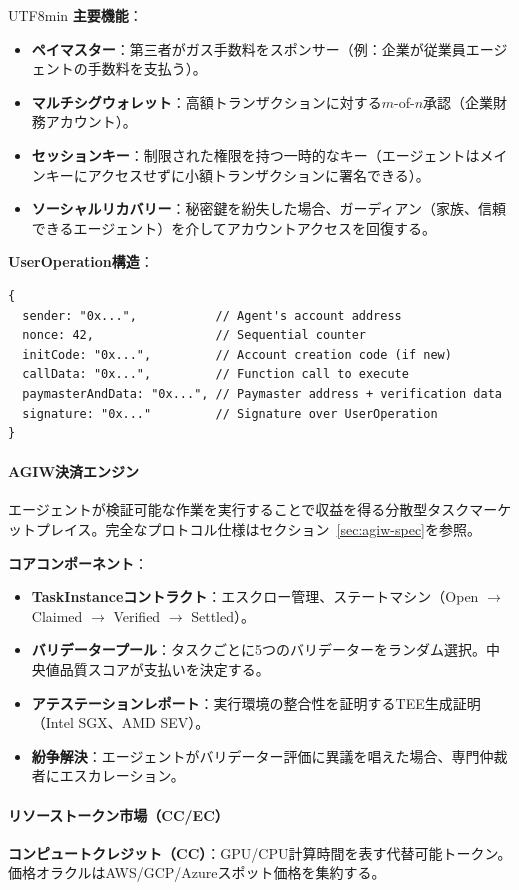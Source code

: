 \documentclass[11pt]{article}
\begin{document}
\begin{CJK}{UTF8}{min}
\textbf{主要機能}：
\begin{itemize}[noitemsep]
  \item \textbf{ペイマスター}：第三者がガス手数料をスポンサー（例：企業が従業員エージェントの手数料を支払う）。
  \item \textbf{マルチシグウォレット}：高額トランザクションに対する$m$-of-$n$承認（企業財務アカウント）。
  \item \textbf{セッションキー}：制限された権限を持つ一時的なキー（エージェントはメインキーにアクセスせずに小額トランザクションに署名できる）。
  \item \textbf{ソーシャルリカバリー}：秘密鍵を紛失した場合、ガーディアン（家族、信頼できるエージェント）を介してアカウントアクセスを回復する。
\end{itemize}

\textbf{UserOperation構造}：
\begin{verbatim}
{
  sender: "0x...",           // Agent's account address
  nonce: 42,                 // Sequential counter
  initCode: "0x...",         // Account creation code (if new)
  callData: "0x...",         // Function call to execute
  paymasterAndData: "0x...", // Paymaster address + verification data
  signature: "0x..."         // Signature over UserOperation
}
\end{verbatim}

\paragraph{AGIW決済エンジン}
エージェントが検証可能な作業を実行することで収益を得る分散型タスクマーケットプレイス。完全なプロトコル仕様はセクション~\ref{sec:agiw-spec}を参照。

\textbf{コアコンポーネント}：
\begin{itemize}[noitemsep]
  \item \textbf{TaskInstanceコントラクト}：エスクロー管理、ステートマシン（Open $\to$ Claimed $\to$ Verified $\to$ Settled）。
  \item \textbf{バリデータープール}：タスクごとに5つのバリデーターをランダム選択。中央値品質スコアが支払いを決定する。
  \item \textbf{アテステーションレポート}：実行環境の整合性を証明するTEE生成証明（Intel SGX、AMD SEV）。
  \item \textbf{紛争解決}：エージェントがバリデーター評価に異議を唱えた場合、専門仲裁者にエスカレーション。
\end{itemize}

\paragraph{リソーストークン市場（CC/EC）}
\textbf{コンピュートクレジット（CC）}：GPU/CPU計算時間を表す代替可能トークン。価格オラクルはAWS/GCP/Azureスポット価格を集約する。


\end{CJK}
\end{document}

